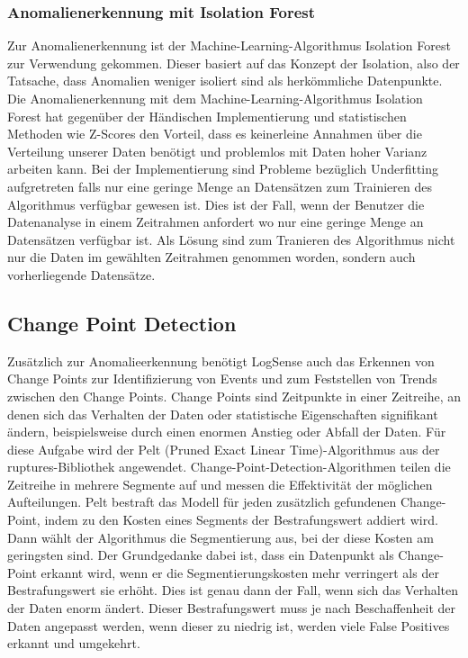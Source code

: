 \documentclass{report}
\begin{document}
\subsubsection{Anomalienerkennung mit Isolation Forest}
Zur Anomalienerkennung ist der Machine-Learning-Algorithmus Isolation Forest zur Verwendung gekommen. Dieser basiert auf das Konzept der Isolation, also der Tatsache, dass Anomalien weniger isoliert sind als herkömmliche Datenpunkte. 
Die Anomalienerkennung mit dem Machine-Learning-Algorithmus Isolation Forest hat gegenüber der Händischen Implementierung und statistischen Methoden wie Z-Scores den Vorteil, dass es keinerleine Annahmen über die Verteilung unserer Daten benötigt und problemlos mit Daten hoher Varianz arbeiten kann.
Bei der Implementierung sind Probleme bezüglich Underfitting aufgretreten falls nur eine geringe Menge an Datensätzen zum Trainieren des Algorithmus verfügbar gewesen ist. Dies ist der Fall, wenn der Benutzer die Datenanalyse in einem Zeitrahmen anfordert wo nur eine geringe Menge an Datensätzen verfügbar ist. Als Lösung sind zum Tranieren des Algorithmus nicht nur die Daten im gewählten Zeitrahmen genommen worden, sondern auch vorherliegende Datensätze. 
\subsection{Change Point Detection}
Zusätzlich zur Anomalieerkennung benötigt LogSense auch das Erkennen von Change Points zur Identifizierung von Events und zum Feststellen von Trends zwischen den Change Points. Change Points sind Zeitpunkte in einer Zeitreihe, an denen sich das Verhalten der Daten oder statistische Eigenschaften signifikant ändern, beispielsweise durch einen enormen Anstieg oder Abfall der Daten. Für diese Aufgabe wird der Pelt (Pruned Exact Linear Time)-Algorithmus aus der ruptures-Bibliothek angewendet. Change-Point-Detection-Algorithmen teilen die Zeitreihe in mehrere Segmente auf und messen die Effektivität der möglichen Aufteilungen. Pelt bestraft das Modell für jeden zusätzlich gefundenen Change-Point, indem zu den Kosten eines Segments der Bestrafungswert addiert wird. Dann wählt der Algorithmus die Segmentierung aus, bei der diese Kosten am geringsten sind. Der Grundgedanke dabei ist, dass ein Datenpunkt als Change-Point erkannt wird, wenn er die Segmentierungskosten mehr verringert als der Bestrafungswert sie erhöht. Dies ist genau dann der Fall, wenn sich das Verhalten der Daten enorm ändert. Dieser Bestrafungswert muss je nach Beschaffenheit der Daten angepasst werden, wenn dieser zu niedrig ist, werden viele False Positives erkannt und umgekehrt.
\end{document}
